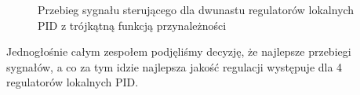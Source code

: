 \begin{figure}[b]
    \centering
    \caption{Przebieg sygnału sterującego dla dwunastu regulatorów lokalnych PID z trójkątną  funkcją przynależności}
    \label{pro_zad5_triangle_12_inp}
\end{figure}
\FloatBarrier

Jednogłośnie całym zespołem podjęliśmy decyzję, że najlepsze przebiegi sygnałów, a co za tym idzie najlepsza jakość regulacji występuje dla 4 regulatorów lokalnych PID.  